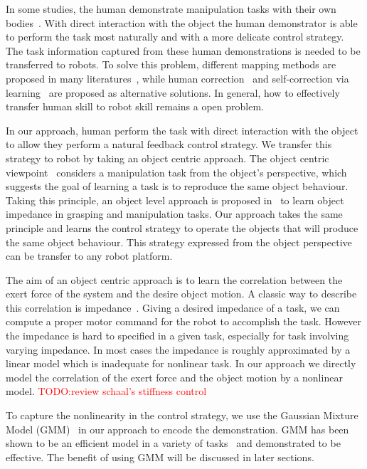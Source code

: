 In some studies, the human demonstrate manipulation tasks with their own bodies~\cite{asfour2008imitation}. With direct interaction with the object the human demonstrator is able to perform the task most naturally and with a more delicate control strategy. The task information captured from these human demonstrations is needed to be transferred to robots. To solve this problem, different mapping methods are proposed in many literatures~\cite{do2011towards,asfour2008imitation,hueser2006learning}, while human correction~\cite{calinon2007incremental,sauser2011iterative,romano2011human} and self-correction via learning~\cite{bidan2013robio} are proposed as alternative solutions. In general, how to effectively transfer human skill to robot skill remains a open problem.

In our approach, human perform the task with direct interaction with the object to allow they perform a natural feedback control strategy. We transfer this strategy to robot by taking an object centric approach. The object centric viewpoint~\cite{okamura2000overview} considers a manipulation task from the object's perspective, which suggests the goal of learning a task is to reproduce the same object behaviour. Taking this principle, an object level approach is proposed in~\cite{Miao2014} to learn object impedance in grasping and manipulation tasks. Our approach takes the same principle and learns the control strategy to operate the objects that will produce the same object behaviour. This strategy expressed from the object perspective can be transfer to any robot platform.

The aim of an object centric approach is to learn the correlation between the exert force of the system and the desire object motion. A classic way to describe this correlation is impedance~\cite{howard2010transferring,wimbock2012comparison}. Giving a desired impedance of a task, we can compute a proper motor command for the robot to accomplish the task. However the impedance is hard to specified in a given task, especially for task involving varying impedance. In most cases the impedance is roughly approximated by a linear model which is inadequate for nonlinear task. In our approach we directly model the correlation of the exert force and the object motion by a nonlinear model. \textcolor{red}{TODO:review schaal's stiffness control}

To capture the nonlinearity in the control strategy, we use the Gaussian Mixture Model (GMM)~\cite{cohn1996active} in our approach to encode the demonstration. GMM has been shown to be an efficient model in a variety of tasks~\cite{huang2013learning,sauser2011iterative,calinon2007incremental} and demonstrated to be effective. The benefit of using GMM will be discussed in later sections.

